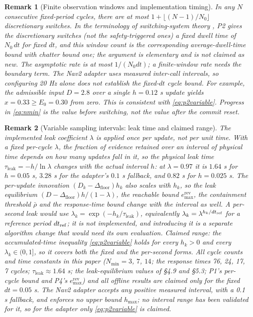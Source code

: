 \documentclass[11pt]{article}
\newtheorem{remark}{Remark}
\newcommand{\Dfloor}{\Delta_{\text{floor}}}
\newcommand{\Eremax}{e^{\text{rev}}_{\max}}
\begin{document}
\begin{remark}[Finite observation windows and implementation timing]
In any $N$ consecutive fixed-period cycles, there are at most $1+\lfloor(N-1)/N_0\rfloor$ discretionary switches. In the terminology of switching-system theory \cite{hespanha1999dwell}, P2 gives the discretionary switches (not the safety-triggered ones) a fixed dwell time of $N_0\,dt$ for fixed $dt$, and this window count is the corresponding average-dwell-time bound with chatter bound one; the argument is elementary and is not claimed as new. The asymptotic rate is at most $1/(N_0dt)$; a finite-window rate needs the boundary term. The Nav2 adapter uses measured inter-call intervals, so configuring 20 Hz alone does not establish the fixed-$dt$ cycle bound. For example, the admissible input $D=2.8$ over a single $h=0.12$ s update yields $x=0.33\ge E_0=0.30$ from zero. This is consistent with \eqref{eq:p2variable}. Progress in \eqref{eq:nmin} is the value before switching, not the value after the commit reset.
\end{remark}

\begin{remark}[Variable sampling intervals: leak time and claimed range] \label{rem:vardt}
The implemented leak coefficient $\lambda$ is applied once per update, not per unit time. With a fixed per-cycle $\lambda$, the fraction of evidence retained over an interval of physical time depends on how many updates fall in it, so the physical leak time $\tau_{\text{leak}}=-h/\ln\lambda$ changes with the actual interval $h$: at $\lambda=0.97$ it is $1.64$ s for $h=0.05$ s, $3.28$ s for the adapter's $0.1$ s fallback, and $0.82$ s for $h=0.025$ s. The per-update innovation $(D_k-\Dfloor)h_k$ also scales with $h_k$, so the leak equilibrium $(D-\Dfloor)h/(1-\lambda)$, the reachable bound $\Eremax$, the containment threshold $\bar\rho$ and the response-time bound change with the interval as well. A per-second leak would use $\lambda_k=\exp(-h_k/\tau_{\text{leak}})$, equivalently $\lambda_k=\lambda^{h_k/dt_{\rm ref}}$ for a reference period $dt_{\rm ref}$; it is not implemented, and introducing it is a separate algorithm change that would need its own evaluation. Claimed range: the accumulated-time inequality \eqref{eq:p2variable} holds for every $h_k>0$ and every $\lambda_k\in(0,1]$, so it covers both the fixed and the per-second forms. All cycle counts and time constants in this paper ($N_{\min}=3$, $7$, $14$; the response times 76, 24, 17, 7 cycles; $\tau_{\text{leak}}\approx1.64$ s; the leak-equilibrium values of \S4.9 and \S5.3; P1's per-cycle bound and P4's $\Eremax$) and all offline results are claimed only for the fixed $dt=0.05$ s. The Nav2 adapter accepts any positive measured interval, with a 0.1 s fallback, and enforces no upper bound $h_{\max}$; no interval range has been validated for it, so for the adapter only \eqref{eq:p2variable} is claimed.
\end{remark}
\end{document}
